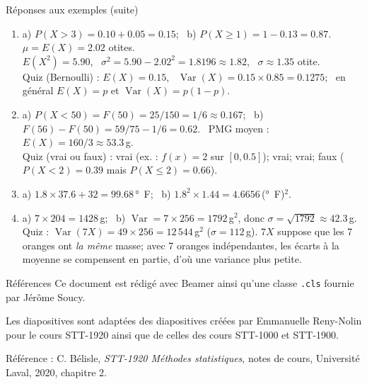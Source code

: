 \documentclass{BeamerTemplate}
\begin{document}
\begin{frame}[t]{Réponses aux exemples (suite)}
  \scriptsize
  \begin{enumerate}\itemsep 1.2mm
    \setcounter{enumi}{5}
    \item a) $P(X > 3) = 0.10 + 0.05 = 0.15$; \ b) $P(X \ge 1) = 1 - 0.13 = 0.87$.
      \ $\mu = E(X) = 2.02$ otites.\\
      $E(X^2) = 5.90$, \ $\sigma^2 = 5.90 - 2.02^2 = 1.8196 \approx 1.82$,
      \ $\sigma \approx 1.35$ otite.\\
      Quiz (Bernoulli) : $E(X) = 0.15$, \ $\operatorname{Var}(X) = 0.15 \times 0.85 = 0.1275$;
      \ en général $E(X) = p$ et $\operatorname{Var}(X) = p(1-p)$.
    \item a) $P(X < 50) = F(50) = 25/150 = 1/6 \approx 0.167$; \
      b) $F(56) - F(50) = 59/75 - 1/6 = 0.62$. \ PMG moyen :
      $E(X) = 160/3 \approx 53.3$\,g.\\
      Quiz (vrai ou faux) : vrai (ex. : $f(x) = 2$ sur $[0, 0.5]$); vrai;
      vrai; faux ($P(X < 2) = 0.39$ mais $P(X \le 2) = 0.66$).
    \item a) $1.8 \times 37.6 + 32 = 99.68$\,\si{\degree F}; \
      b) $1.8^2 \times 1.44 = 4.6656$\,(\si{\degree F})$^2$.
    \item a) $7 \times 204 = 1428$\,g; \
      b) $\operatorname{Var} = 7 \times 256 = 1792$\,g$^2$, donc
      $\sigma = \sqrt{1792} \approx 42.3$\,g.\\
      Quiz : $\operatorname{Var}(7X) = 49 \times 256 = 12\,544$\,g$^2$
      ($\sigma = 112$\,g). $7X$ suppose que les 7 oranges ont \emph{la même}
      masse; avec 7 oranges indépendantes, les écarts à la moyenne se
      compensent en partie, d'où une variance plus petite.
  \end{enumerate}
\end{frame}

\begin{frame}[t]{Références}
  Ce document est rédigé avec Beamer ainsi qu'une classe \texttt{.cls} fournie
  par Jérôme Soucy.

  \medskip
  Les diapositives sont adaptées des diapositives créées par Emmanuelle
  Reny-Nolin pour le cours STT-1920 ainsi que de celles des cours STT-1000 et
  STT-1900.

  \medskip
  Référence : C. Bélisle, \emph{STT-1920 Méthodes statistiques}, notes de
  cours, Université Laval, 2020, chapitre 2.
\end{frame}
\end{document}
